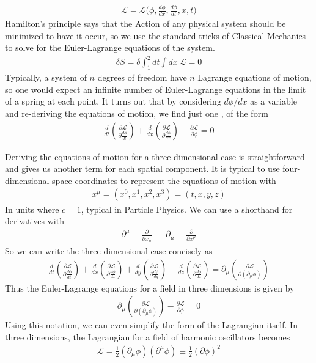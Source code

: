 \begin{align}
    \mathcal{L} = \mathcal{L}\Big(\phi, \frac{d\phi}{dx},\frac{d\phi}{dt}, x,t\Big)
\end{align}
Hamilton's principle says that the Action of any physical system should be minimized to have it occur, so we use the standard tricks of Classical Mechanics to solve for the Euler-Lagrange equations of the system.
\begin{align}
    \delta S = \delta\int_1^2 dt \int dx ~\mathcal{L} = 0
\end{align}
Typically, a system of $n$ degrees of freedom have $n$ Lagrange equations of motion, so one would expect an infinite number of Euler-Lagrange equations in the limit of a spring at each point. It turns out that by considering $d\phi/dx$ as a variable and re-deriving the equations of motion, we find just one \cite{goldstein}, of the form
\begin{align}
    \frac{d}{dt}\left(\frac{\partial\mathcal{L}}{\partial\frac{d\phi}{dt}}\right) + \frac{d}{dx}\left(\frac{\partial\mathcal{L}}{\partial \frac{d\phi}{dx}}\right) - \frac{\partial\mathcal{L}}{\partial \phi} = 0
\end{align}

Deriving the equations of motion for a three dimensional case is straightforward and gives us another term for each spatial component. It is typical to use four-dimensional space coordinates to represent the equations of motion with
\begin{align}
    x^\mu = (x^0, x^1, x^2, x^3) = (t, x, y,z)
\end{align}
In units where $c=1$, typical in Particle Physics. We can use a shorthand for derivatives with 
\begin{align}
    \partial^\mu \equiv \frac{\partial}{\partial x_\mu} && \partial_\mu \equiv \frac{\partial}{\partial x^\mu}
\end{align}
So we can write the three dimensional case concisely as
\begin{align}
    \frac{d}{dt}\left(\frac{\partial\mathcal{L}}{\partial\frac{d\phi}{dt}}\right) + \frac{d}{dx}\left(\frac{\partial\mathcal{L}}{\partial \frac{d\phi}{dx}}\right) +\frac{d}{dy}\left(\frac{\partial\mathcal{L}}{\partial \frac{d\phi}{dy}}\right) + \frac{d}{dz}\left(\frac{\partial\mathcal{L}}{\partial \frac{d\phi}{dz}}\right) = \partial_\mu \left(\frac{\partial\mathcal{L}}{\partial(\partial_\mu\phi)}\right)
\end{align}
Thus the Euler-Lagrange equations for a field in three dimensions is given by
\begin{align}\label{euler-lagrange}
    \boxed{\partial_\mu \left(\frac{\partial\mathcal{L}}{\partial(\partial_\mu\phi)}\right) - \frac{\partial\mathcal{L}}{\partial \phi} = 0}
\end{align}
Using this notation, we can even simplify the form of the Lagrangian itself. In three dimensions, the Lagrangian for a field of harmonic oscillators becomes
\begin{align}\label{harm-osc-lagrange}
    \mathcal{L} = \frac{1}{2}(\partial_\mu\phi)(\partial^\mu \phi) \equiv \frac{1}{2}(\partial\phi)^2
\end{align}

